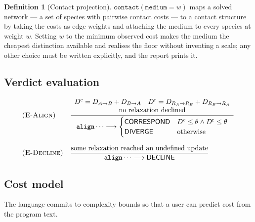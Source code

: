 \documentclass[11pt,twocolumn,a4paper]{article}
\theoremstyle{plain}
\theoremstyle{definition}
\newtheorem{definition}[theorem]{Definition}
\theoremstyle{remark}
\newcommand{\dem}{D}
\newcommand{\kw}[1]{\texttt{\textbf{#1}}}
\begin{document}
\begin{definition}[Contact projection]
\label{def:contactproj}
$\texttt{contact}(\texttt{medium}=w)$ maps a solved network --- a set of
species with pairwise contact costs --- to a contact structure by taking
the costs as edge weights and attaching the medium to every species at
weight $w$. Setting $w$ to the minimum observed cost makes the medium
the cheapest distinction available and realises the floor without
inventing a scale; any other choice must be written explicitly, and the
report prints it.
\end{definition}

\subsection{Verdict evaluation}

\begin{align*}
&\textsc{(E-Align)} &&
\frac{\begin{array}{c}
 \dem^{\mathrm{c}} = \dem_{A\to B}+\dem_{B\to A}\quad
 \dem^{\mathrm{r}} = \dem_{R_A\to R_B}+\dem_{R_B\to R_A}\\
 \text{no relaxation declined}
\end{array}}
{\kw{align}\cdots \longrightarrow
 \begin{cases}
 \textsf{CORRESPOND} & \dem^{\mathrm{c}}\le\theta \wedge \dem^{\mathrm{r}}\le\theta\\
 \textsf{DIVERGE} & \text{otherwise}
 \end{cases}}
\\[8pt]
&\textsc{(E-Decline)} &&
\frac{\text{some relaxation reached an undefined update}}
     {\kw{align}\cdots \longrightarrow \textsf{DECLINE}}
\end{align*}

\subsection{Cost model}
\label{sec:costmodel}

The language commits to complexity bounds so that a user can predict
cost from the program text.
\end{document}
